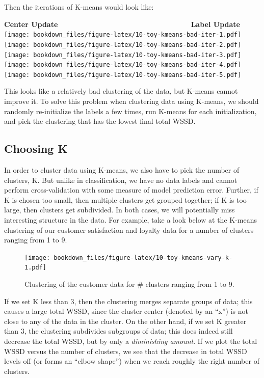 \documentclass[
]{krantz}
\begin{document}
Then the iterations of K-means would look like:

\textbf{Center Update}                            \textbf{Label Update}
\texttt{[image: bookdown\_files/figure-latex/10-toy-kmeans-bad-iter-1.pdf]} \texttt{[image: bookdown\_files/figure-latex/10-toy-kmeans-bad-iter-2.pdf]} \texttt{[image: bookdown\_files/figure-latex/10-toy-kmeans-bad-iter-3.pdf]} \texttt{[image: bookdown\_files/figure-latex/10-toy-kmeans-bad-iter-4.pdf]} \texttt{[image: bookdown\_files/figure-latex/10-toy-kmeans-bad-iter-5.pdf]}

This looks like a relatively bad clustering of the data, but K-means cannot improve it.
To solve this problem when clustering data using K-means, we should randomly re-initialize the labels a few times, run K-means for each initialization,
and pick the clustering that has the lowest final total WSSD.

\hypertarget{choosing-k}{%
\subsection{Choosing K}\label{choosing-k}}

In order to cluster data using K-means, we also have to pick the number of clusters, K.
But unlike in classification, we have no data labels and cannot perform
cross-validation with some measure of model prediction error.
Further, if K is chosen too small, then multiple clusters get grouped together;
if K is too large, then clusters get subdivided. In both cases, we will potentially miss
interesting structure in the data. For example, take a look below at the K-means
clustering of our customer satisfaction and loyalty data for a number of clusters
ranging from 1 to 9.

\begin{figure}
\centering
\texttt{[image: bookdown\_files/figure-latex/10-toy-kmeans-vary-k-1.pdf]}
\caption{\label{fig:10-toy-kmeans-vary-k}Clustering of the customer data for \# clusters ranging from 1 to 9.}
\end{figure}

If we set K less than 3, then the clustering merges separate groups of data; this causes a large
total WSSD, since the cluster center (denoted by an ``x'') is not close to any of the data in the cluster. On
the other hand, if we set K greater than 3, the clustering subdivides subgroups of data; this does indeed still
decrease the total WSSD, but by only a \emph{diminishing amount}. If we plot the total WSSD versus the number of
clusters, we see that the decrease in total WSSD levels off (or forms an ``elbow shape'') when we reach roughly
the right number of clusters.
\end{document}
